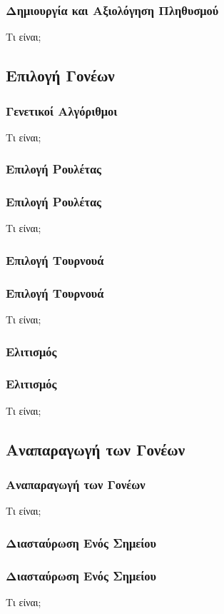 \documentclass[xetex,mathserif,serif,14pt]{beamer}
\begin{document}
\begin{frame}
\frametitle{Δημιουργία και Αξιολόγηση Πληθυσμού}
Τι είναι;
\end{frame}

\subsection{Επιλογή Γονέων}

\begin{frame}
\frametitle{Γενετικοί Αλγόριθμοι}
Τι είναι;
\end{frame}

\subsubsection*{Επιλογή Ρουλέτας}

\begin{frame}
\frametitle{Επιλογή Ρουλέτας}
Τι είναι;
\end{frame}

\subsubsection*{Επιλογή Τουρνουά}

\begin{frame}
\frametitle{Επιλογή Τουρνουά}
Τι είναι;
\end{frame}

\subsubsection*{Ελιτισμός}

\begin{frame}
\frametitle{Ελιτισμός}
Τι είναι;
\end{frame}

\subsection{Αναπαραγωγή των Γονέων}

\begin{frame}
\frametitle{Αναπαραγωγή των Γονέων}
Τι είναι;
\end{frame}

\subsubsection{Διασταύρωση Ενός Σημείου}

\begin{frame}
\frametitle{Διασταύρωση Ενός Σημείου}
Τι είναι;
\end{frame}
\end{document}
